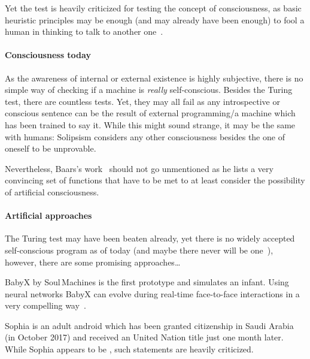 Yet the test is heavily criticized for testing the concept of consciousness, as basic heuristic principles may be enough (and may already have been enough) to fool a human in thinking to talk to another one~\cite{john1980minds}.

\paragraph{Consciousness today} As the awareness of internal or external existence is highly subjective, there is no simple way of checking if a machine is \emph{really} self-conscious. Besides the Turing test, there are countless tests. Yet, they may all fail as any introspective or conscious sentence can be the result of external programming/a machine which has been trained to say it.
While this might sound strange, it may be the same with humans: Solipsism considers any other consciousness besides the one of oneself to be unprovable.

Nevertheless, Baars's work~\cite{baars1993cognitive} should not go unmentioned as he lists a very convincing set of functions that have to be met to at least consider the possibility of artificial consciousness.


\paragraph{Artificial approaches}
The Turing test may have been beaten already, yet there is no widely accepted self-conscious program as of today (and maybe there never will be one~\cite[p.~231]{Meissner2020}), however, there are some promising approaches\ldots

BabyX by Soul\,Machines is the first prototype and simulates an infant. Using neural networks BabyX can evolve during real-time face-to-face interactions in a very compelling way~\cite{Sagar2015}.

Sophia is an adult android which has been granted citizenship in Saudi Arabia (in October 2017) and received an United Nation title just one month later. While Sophia appears to be , such statements are heavily criticized.

